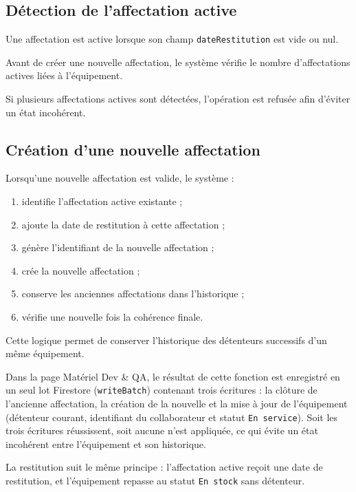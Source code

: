 \documentclass{rapportENSIAS}
\begin{document}
\subsection{Détection de l’affectation active}

Une affectation est active lorsque son champ \texttt{dateRestitution} est vide ou nul.

Avant de créer une nouvelle affectation, le système vérifie le nombre d’affectations actives liées à l’équipement.

Si plusieurs affectations actives sont détectées, l’opération est refusée afin d’éviter un état incohérent.

\subsection{Création d’une nouvelle affectation}

Lorsqu’une nouvelle affectation est valide, le système :

\begin{enumerate}
    \item identifie l’affectation active existante ;
    \item ajoute la date de restitution à cette affectation ;
    \item génère l’identifiant de la nouvelle affectation ;
    \item crée la nouvelle affectation ;
    \item conserve les anciennes affectations dans l’historique ;
    \item vérifie une nouvelle fois la cohérence finale.
\end{enumerate}

Cette logique permet de conserver l’historique des détenteurs successifs d’un même équipement.

Dans la page Matériel Dev \& QA, le résultat de cette fonction est enregistré en un seul lot Firestore (\texttt{writeBatch}) contenant trois écritures : la clôture de l’ancienne affectation, la création de la nouvelle et la mise à jour de l’équipement (détenteur courant, identifiant du collaborateur et statut \texttt{En service}). Soit les trois écritures réussissent, soit aucune n’est appliquée, ce qui évite un état incohérent entre l’équipement et son historique.

La restitution suit le même principe : l’affectation active reçoit une date de restitution, et l’équipement repasse au statut \texttt{En stock} sans détenteur.
\end{document}
